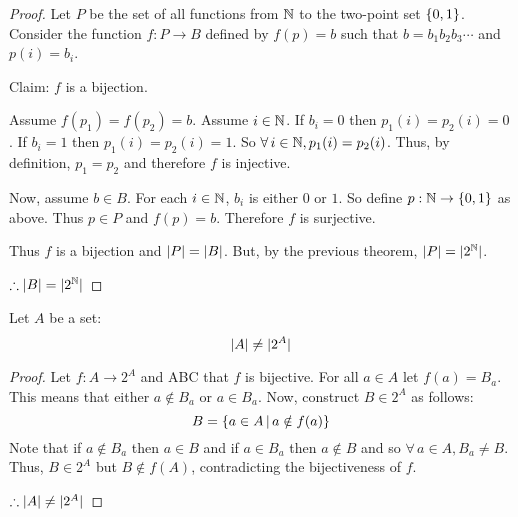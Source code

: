 \documentclass[letterpaper,12pt,fleqn]{article}
\begin{document}
\begin{proof}
  Let \(P\) be the set of all functions from \(\mathbb{N}\) to the two-point set \(\{0,1\}\).  Consider the function
  \(f:P\to B\) defined by \(f(p)=b\) such that \(b=b_1b_2b_3\cdots\) and \(p(i)=b_i\).

  Claim: \(f\) is a bijection.

  Assume \(f(p_1)=f(p_2)=b\).  Assume \(i\in\mathbb{N}\).  If \(b_i=0\) then \(p_1(i)=p_2(i)=0\).  If \(b_i=1\) then
  \(p_1(i)=p_2(i)=1\).  So \(\forall\,i\in\mathbb{N},p_1(i)=p_2(i)\).  Thus, by definition, \(p_1=p_2\) and therefore \(f\)
  is injective.

  Now, assume \(b\in B\).  For each \(i\in\mathbb{N}\), \(b_i\) is either \(0\) or \(1\).  So define \(p:\mathbb{N}\to\{0,1\}\) as
  above.  Thus \(p\in P\) and \(f(p)=b\).  Therefore \(f\) is surjective.

  Thus \(f\) is a bijection and \(\lvert P\rvert=\lvert B\rvert\).  But, by the previous theorem, \(\lvert P\rvert=\lvert2^{\mathbb{N}}\rvert\).

  \(\therefore\lvert B\rvert=\lvert2^{\mathbb{N}}\rvert\)
\end{proof}

\begin{theorem}
  Let \(A\) be a set:
  \[\lvert A\rvert\ne\lvert2^A\rvert\]
\end{theorem}

\begin{proof}
  Let \(f:A\to2^A\) and ABC that \(f\) is bijective.  For all \(a\in A\) let \(f(a)=B_a\).  This means that either
  \(a\notin B_a\) or \(a\in B_a\).  Now, construct \(B\in2^A\) as follows:
  \[B=\left\{{a\in A}\,\middle|\,{a\notin f(a)}\right\}\]
  Note that if \(a\notin B_a\) then \(a\in B\) and if \(a\in B_a\) then \(a\notin B\) and so \(\forall\,a\in
  A,B_a\ne B\).  Thus, \(B\in2^A\) but \(B\notin f(A)\), contradicting the bijectiveness of \(f\).

  \(\therefore\lvert A\rvert\ne\lvert2^A\rvert\)
\end{proof}
\end{document}
